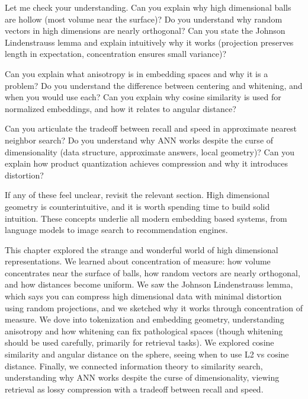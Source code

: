 
\begin{pausebox}
Let me check your understanding. Can you explain why high dimensional balls are hollow (most volume near the surface)? Do you understand why random vectors in high dimensions are nearly orthogonal? Can you state the Johnson Lindenstrauss lemma and explain intuitively why it works (projection preserves length in expectation, concentration ensures small variance)?

\vspace{0.5em}

Can you explain what anisotropy is in embedding spaces and why it is a problem? Do you understand the difference between centering and whitening, and when you would use each? Can you explain why cosine similarity is used for normalized embeddings, and how it relates to angular distance?

\vspace{0.5em}

Can you articulate the tradeoff between recall and speed in approximate nearest neighbor search? Do you understand why ANN works despite the curse of dimensionality (data structure, approximate answers, local geometry)? Can you explain how product quantization achieves compression and why it introduces distortion?

\vspace{0.5em}

If any of these feel unclear, revisit the relevant section. High dimensional geometry is counterintuitive, and it is worth spending time to build solid intuition. These concepts underlie all modern embedding based systems, from language models to image search to recommendation engines.
\end{pausebox}

\vspace{1em}

This chapter explored the strange and wonderful world of high dimensional representations. We learned about concentration of measure: how volume concentrates near the surface of balls, how random vectors are nearly orthogonal, and how distances become uniform. We saw the Johnson Lindenstrauss lemma, which says you can compress high dimensional data with minimal distortion using random projections, and we sketched why it works through concentration of measure. We dove into tokenization and embedding geometry, understanding anisotropy and how whitening can fix pathological spaces (though whitening should be used carefully, primarily for retrieval tasks). We explored cosine similarity and angular distance on the sphere, seeing when to use L2 vs cosine distance. Finally, we connected information theory to similarity search, understanding why ANN works despite the curse of dimensionality, viewing retrieval as lossy compression with a tradeoff between recall and speed.

